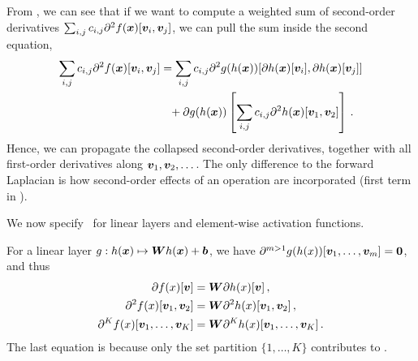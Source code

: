 From , we can see that if we want to compute a weighted sum of second-order derivatives $\sum_{i,j} c_{i,j} \partial^2 f({\bm{x}})[{\bm{v}}_i, {\bm{v}}_j]$, we can pull the sum inside the second equation,
\begin{align}\label{eq:taylor-mode-multi-directional-1-2-sum-inside}
  \begin{split}
    \sum_{i,j} c_{i,j} \partial^2 f({\bm{x}}) [{\bm{v}}_i, {\bm{v}}_j]
    &=
      \sum_{i,j} c_{i,j} \partial^2 g(h({\bm{x}})) [\partial h({\bm{x}}) [{\bm{v}}_i], \partial h({\bm{x}}) [{\bm{v}}_j]]
    \\
    &\phantom{=}+
      \partial g(h({\bm{x}}))
      \left[
      \sum_{i,j} c_{i,j}
      \partial^2 h({\bm{x}}) [{\bm{v}}_1, {\bm{v}}_2]
      \right]\,.
  \end{split}
\end{align}
Hence, we can propagate the collapsed second-order derivatives, together with all first-order derivatives along ${\bm{v}}_1, {\bm{v}}_2, \dots$. The only difference to the forward Laplacian is how second-order effects of an operation are incorporated (first term in ).

We now specify~ for linear layers and element-wise activation functions.

For a linear layer $g: h({\bm{x}}) \mapsto {\bm{W}} h({\bm{x}}) + {\bm{b}}$, we have $\partial^{m>1}g(h(x))[{\bm{v}}_1, \dots, {\bm{v}}_m] = {\bm{0}}$, and thus
\begin{subequations}\label{eq:taylor-mode-multi-directional-1-2-linear}
  \begin{align}
    \partial f(x) [{\bm{v}}]
    &=
      {\bm{W}} \partial h(x) [{\bm{v}}]\,,
    \\
    \partial^2 f(x) [{\bm{v}}_1, {\bm{v}}_2]
    &=
      {\bm{W}} \partial^2 h(x) [{\bm{v}}_1, {\bm{v}}_2]\,,
    \\
    \partial^K f(x) [{\bm{v}}_1, \dots, {\bm{v}}_K]
    &=
      {\bm{W}} \partial^K h(x) [{\bm{v}}_1, \dots, {\bm{v}}_K]\,.
  \end{align}
\end{subequations}
The last equation is because only the set partition $\{1, \dots, K\}$ contributes to .

